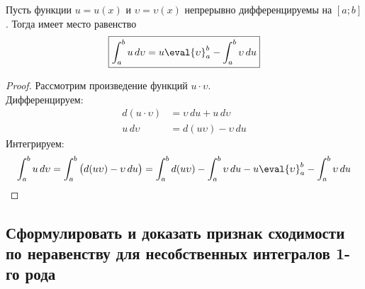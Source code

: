 \begin{theorem}
    Пусть функции $u = u(x)$ и $\upsilon = \upsilon(x)$ непрерывно дифференцируемы на $[a;b]$. Тогда имеет место равенство
    \begin{gather*}
        \boxed{\int_{a}^{b} u\, d\upsilon = u\eval{\upsilon}_{a}^{b} - \int_{a}^{b} \upsilon\, du}
    \end{gather*}
\end{theorem}
\begin{proof}
    Рассмотрим произведение функций $u\cdot \upsilon$. \\
    Дифференцируем: \vspace{-\topsep}
    \begin{align*}
        d(u\cdot \upsilon) &=  \upsilon\, du + u\, d\upsilon \\ 
        u\, d\upsilon &= d(u \upsilon) - \upsilon\, du
    \end{align*}
    Интегрируем:
    \begin{align*}
        \int_{a}^{b} u\, d\upsilon = \int_{a}^{b} \big(d(u\upsilon) - \upsilon\, du\big) = \int_{a}^{b} d(u\upsilon) - \int_{a}^{b} \upsilon\, du - u\eval{\upsilon}_{a}^{b} - \int_{a}^{b} \upsilon\, du
    \end{align*}
\end{proof}

\newpage
\subsection{Сформулировать и доказать признак сходимости по неравенству для несобственных интегралов 1-го рода}

